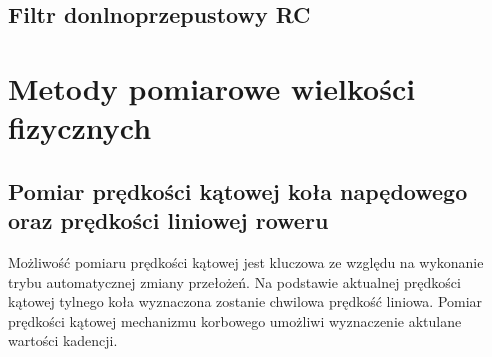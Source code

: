\subsection{Filtr donlnoprzepustowy RC}
\label{filtrRc}
\section{Metody pomiarowe wielkości fizycznych}
\subsection{Pomiar prędkości kątowej koła napędowego oraz prędkości liniowej roweru}

Możliwość pomiaru prędkości kątowej jest kluczowa ze względu na wykonanie trybu automatycznej zmiany przełożeń. Na podstawie aktualnej prędkości kątowej tylnego koła wyznaczona zostanie chwilowa prędkość liniowa. Pomiar prędkości kątowej mechanizmu korbowego umożliwi wyznaczenie aktulane wartości kadencji.

